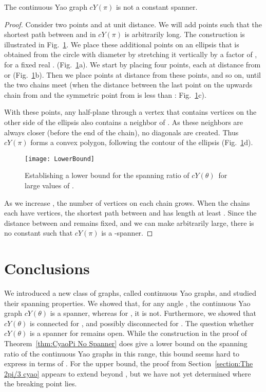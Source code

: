 \documentclass{cccg14}
\newcommand{\cyao}{\ensuremath{cY(\theta)}\xspace}
\newcommand{\cyaopi}{\ensuremath{cY(\pi)}\xspace}
\begin{document}
\begin{theorem}
 \label{thm:CyaoPi No Spanner}
 The continuous Yao graph \cyaopi is not a constant spanner.
\end{theorem}
\begin{proof}
 Consider two points  and  at unit distance. We will add points such that the shortest path between  and  in \cyaopi is arbitrarily long. The construction is illustrated in Fig.~\ref{fig:LowerBound}. We place these additional points on an ellipsis that is obtained from the circle with diameter  by stretching it vertically by a factor of , for a fixed real .  (Fig.~\ref{fig:LowerBound}a). We start by placing four points, each at distance  from  or  (Fig.~\ref{fig:LowerBound}b). Then we place points at distance  from these points, and so on, until the two chains meet (when the distance between the last point on the upwards chain from  and the symmetric point from  is less than : Fig.~\ref{fig:LowerBound}c).
 
 With these points, any half-plane through a vertex  that contains vertices on the other side of the ellipsis also contains a neighbor of .
As these neighbors are always closer (before the end of the chain), no diagonals are created. Thus \cyaopi forms a convex polygon, following the contour of the ellipsis (Fig.~\ref{fig:LowerBound}d).

\begin{figure}[t]
 \centering
 \texttt{[image: LowerBound]}
 \caption{\small  Establishing a lower bound for the spanning ratio of \cyao\ for large values of .}
 \label{fig:LowerBound}
\end{figure}

 As we increase , the number of vertices on each chain grows. When the chains each have  vertices, the shortest path between  and  has length at least . Since the distance between  and  remains fixed, and we can make  arbitrarily large, there is no constant  such that \cyaopi is a -spanner.
\end{proof}

\section{Conclusions}
We introduced a new class of graphs, called continuous Yao graphs, and studied their spanning properties. We showed that, for any angle , the continuous Yao graph \cyao is a spanner, whereas for , it is not. Furthermore, we showed that \cyao is connected for , and possibly disconnected for . The question whether \cyao is a spanner for  remains open. While the construction in the proof of Theorem~\ref{thm:CyaoPi No Spanner} does give a lower bound on the spanning ratio of the continuous Yao graphs in this range, this bound seems hard to express in terms of . For the upper bound, the proof from Section~\ref{section:The 2pi/3 cyao} appears to extend beyond , but we have not yet determined where the breaking point lies.
\end{document}
